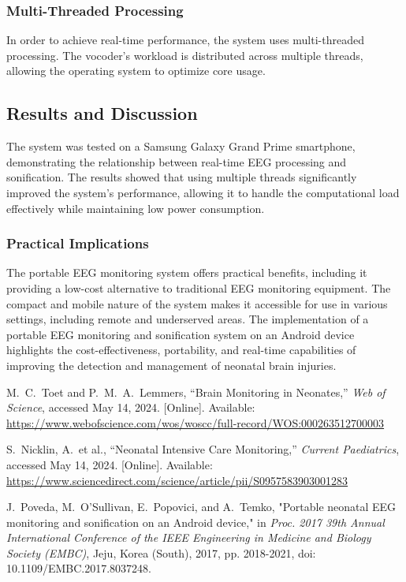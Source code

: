\documentclass[12pt,journal,compsoc]{IEEEtran}
\begin{document}
\subsubsection{Multi-Threaded Processing}
In order to achieve real-time performance, the system uses multi-threaded processing. The vocoder's workload is distributed across multiple threads, allowing the operating system to optimize core usage.  

\subsection{Results and Discussion}
The system was tested on a Samsung Galaxy Grand Prime smartphone, demonstrating the relationship between real-time EEG processing and sonification. The results showed that using multiple threads significantly improved the system's performance, allowing it to handle the computational load effectively while maintaining low power consumption.  

\subsubsection{Practical Implications}
The portable EEG monitoring system offers practical benefits, including it providing a low-cost alternative to traditional EEG monitoring equipment. The compact and mobile nature of the system makes it accessible for use in various settings, including remote and underserved areas. The implementation of a portable EEG monitoring and sonification system on an Android device highlights the cost-effectiveness, portability, and real-time capabilities of improving the detection and management of neonatal brain injuries.

\begin{thebibliography}{1}

M.~C.~Toet and P.~M.~A.~Lemmers, “Brain Monitoring in Neonates,” \emph{Web of Science}, accessed May 14, 2024. [Online]. Available: \url{https://www.webofscience.com/wos/woscc/full-record/WOS:000263512700003}

S.~Nicklin, A.~et al., “Neonatal Intensive Care Monitoring,” \emph{Current Paediatrics}, accessed May 14, 2024. [Online]. Available: \url{https://www.sciencedirect.com/science/article/pii/S0957583903001283}

J.~Poveda, M.~O'Sullivan, E.~Popovici, and A.~Temko, "Portable neonatal EEG monitoring and sonification on an Android device," in \emph{Proc. 2017 39th Annual International Conference of the IEEE Engineering in Medicine and Biology Society (EMBC)}, Jeju, Korea (South), 2017, pp. 2018-2021, doi: 10.1109/EMBC.2017.8037248.

\end{thebibliography}
\end{document}
